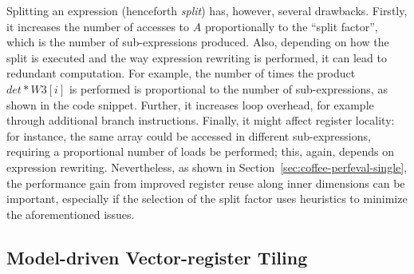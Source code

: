 Splitting an expression (henceforth \emph{split}) has, however, several drawbacks. Firstly, it increases the number of accesses to $A$ proportionally to the ``split factor'', which is the number of sub-expressions produced. Also, depending on how the split is executed and the way expression rewriting is performed, it can lead to redundant computation. For example, the number of times the product $det*W3[i]$ is performed is proportional to the number of sub-expressions, as shown in the code snippet. Further, it increases loop overhead, for example through additional branch instructions. Finally, it might affect register locality: for instance, the same array could be accessed in different sub-expressions, requiring a proportional number of loads be performed; this, again, depends on expression rewriting. Nevertheless, as shown in Section~\ref{sec:coffee-perfeval-single}, the performance gain from improved register reuse along inner dimensions can be important, especially if the selection of the split factor uses heuristics to minimize the aforementioned issues.

\subsection{Model-driven Vector-register Tiling}
\label{sec:coffee-opvect}

